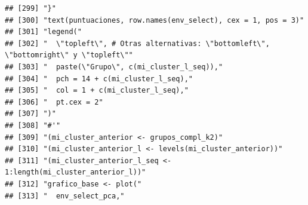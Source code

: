\documentclass[11pt,]{article}
\begin{document}
\begin{verbatim}
## [299] "}"                                                                                                                                                                     
## [300] "text(puntuaciones, row.names(env_select), cex = 1, pos = 3)"                                                                                                           
## [301] "legend("                                                                                                                                                               
## [302] "  \"topleft\", # Otras alternativas: \"bottomleft\", \"bottomright\" y \"topleft\""                                                                                    
## [303] "  paste(\"Grupo\", c(mi_cluster_l_seq)),"                                                                                                                              
## [304] "  pch = 14 + c(mi_cluster_l_seq),"                                                                                                                                     
## [305] "  col = 1 + c(mi_cluster_l_seq),"                                                                                                                                      
## [306] "  pt.cex = 2"                                                                                                                                                          
## [307] ")"                                                                                                                                                                     
## [308] "#'"                                                                                                                                                                    
## [309] "(mi_cluster_anterior <- grupos_compl_k2)"                                                                                                                              
## [310] "(mi_cluster_anterior_l <- levels(mi_cluster_anterior))"                                                                                                                
## [311] "(mi_cluster_anterior_l_seq <- 1:length(mi_cluster_anterior_l))"                                                                                                        
## [312] "grafico_base <- plot("                                                                                                                                                 
## [313] "  env_select_pca,"                                                                                                                                                     

\end{verbatim}
\end{document}
